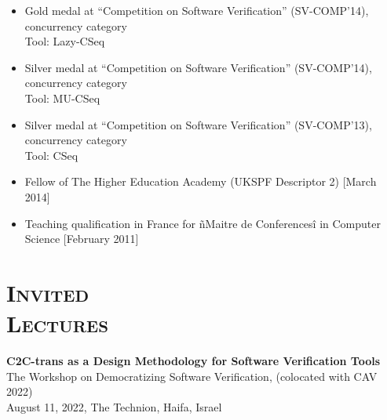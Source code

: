 \begin{resume}
\begin{itemize}
   \item Gold medal at ``Competition on Software Verification''  (SV-COMP'14), concurrency category\\
    Tool: Lazy-CSeq
   \item Silver medal at ``Competition on Software Verification''  (SV-COMP'14), concurrency category\\
    Tool: MU-CSeq

   \item Silver medal at ``Competition on Software Verification''  (SV-COMP'13), concurrency category\\
    Tool: CSeq

   \item Fellow of The Higher Education Academy (UKSPF Descriptor 2) [March 2014]
   \item Teaching qualification in France for ñMaitre de Conferencesî in Computer Science [February 2011]

\end{itemize}









\section{\bfseries \scshape  Invited \\Lectures}






{\bf C2C-trans as a Design Methodology for Software Verification Tools}\\
The Workshop on
Democratizing Software Verification, 
(colocated with CAV 2022)\\
August 11, 2022, The Technion, Haifa, Israel






\end{resume}
